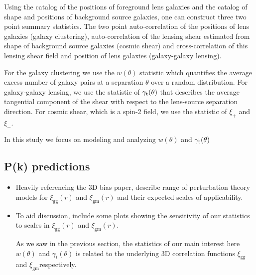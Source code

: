 \documentclass[fleqn,usenatbib]{mnras}
\newcommand{\gammat}{\ensuremath{\gamma_{t}(\theta)} }
\newcommand{\xigg}{\ensuremath{\xi_{\mathrm{gg}}}}
\newcommand{\xigm}{\ensuremath{\xi_{\mathrm{gm}}}}
\begin{document}
Using the catalog of the positions of foreground lens galaxies and the catalog of shape and positions of background source galaxies, one can construct three two point summary statistics. The two point auto-correlation of the positions of lens galaxies (galaxy clustering), auto-correlation of the lensing shear estimated from shape of background source galaxies (cosmic shear) and  cross-correlation of this lensing shear field and position of lens galaxies (galaxy-galaxy lensing). 

For the galaxy clustering we use the $w(\theta)$ statistic which quantifies the average excess number of galaxy pairs at a separation $\theta$ over a random distribution. For galaxy-galaxy lensing, we use the statistic of $\gamma_{\rm t}(\theta)$ that describes the average tangential component of the shear with respect to the lens-source separation direction. For cosmic shear, which is a spin-2 field, we use the statistic of $\xi_{+}$ and $\xi_{-}$. 

In this study we focus on modeling and analyzing $w(\theta)$ and $\gamma_{\rm t}(\theta)$ 

\subsection{P(k) predictions}
\label{sec:Pk_pred}
\begin{itemize}
    \item Heavily referencing the 3D bias paper, describe range of perturbation theory models for $\xigg(r)$ and $\xigm(r)$ and their expected scales of applicability. 
    \item To aid discussion, include some plots showing the sensitivity of our statistics to scales in $\xigg(r)$ and $\xigm(r)$.
    
    As we saw in the previous section, the statistics of our main interest here $w(\theta)$ and $\gammat$ is related to the underlying 3D correlation functions \xigg and \xigm respectively. 
    
\end{itemize}
\end{document}
